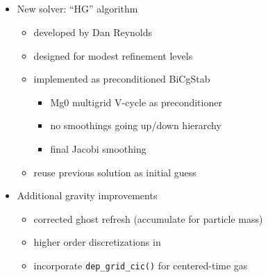\NEWSEC


\subsection{\ssRecentScalableGravity}

\begin{frame}[fragile,label=ss-recent-scalable-gravity] 
\secframetitle{\ssRecentScalableGravity}

\begin{itemize}
\normalsize
  \item New solver: ``HG'' algorithm
  \begin{itemize}
    \item developed by Dan Reynolds
    \item designed for modest refinement levels
    \item implemented as preconditioned BiCgStab
    \begin{itemize}
      \item Mg0 multigrid V-cycle as preconditioner
      \item no smoothings going up/down hierarchy
      \item final Jacobi smoothing
    \end{itemize}
    \item reuse previous solution as initial guess
  \end{itemize}
  \item Additional gravity improvements
  \begin{itemize}
    \item corrected ghost refresh (accumulate for particle mass)
    \item higher order discretizations in 
    \item incorporate \verb+dep_grid_cic()+ for centered-time gas
  \end{itemize}
\end{itemize}
\end{frame}

